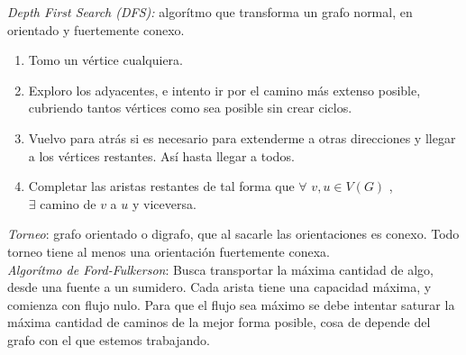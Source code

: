 \documentclass[titlepage,a4paper,12pt,twoside]{article}
\begin{document}
\textit{Depth First Search (DFS):} algorítmo que transforma un grafo normal, en orientado y fuertemente conexo.
\begin{enumerate}
\item Tomo un vértice cualquiera.
\item Exploro los adyacentes, e intento ir por el camino más extenso posible, cubriendo tantos vértices como sea posible sin crear ciclos.
\item Vuelvo para atrás si es necesario para extenderme a otras direcciones y llegar a los vértices restantes. Así hasta llegar a todos.
\item Completar las aristas restantes de tal forma que $\forall $ $ v,u \in V(G)$ ,\\$\exists$ camino de $v$ a $u$ y viceversa.
\end{enumerate}

\textit{Torneo}: grafo orientado o digrafo, que al sacarle las orientaciones es conexo. Todo torneo tiene al menos una orientación fuertemente conexa.\\

\textit{Algorítmo de Ford-Fulkerson}: Busca transportar la máxima cantidad de algo, desde una fuente a un sumidero. Cada arista tiene una capacidad máxima, y comienza con flujo nulo. Para que el flujo sea máximo se debe intentar saturar la máxima cantidad de caminos de la mejor forma posible, cosa de depende del grafo con el que estemos trabajando. 
\end{document}
